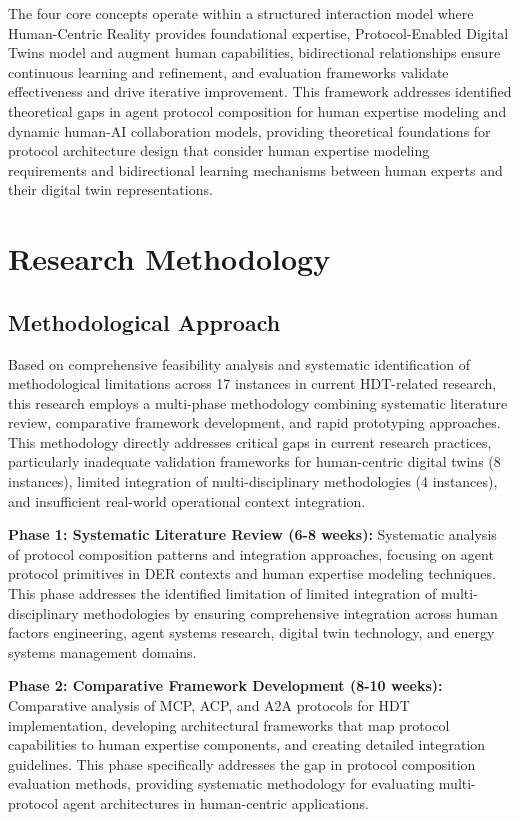 \documentclass[12pt,a4paper]{article}
\begin{document}
The four core concepts operate within a structured interaction model where Human-Centric Reality provides foundational expertise, Protocol-Enabled Digital Twins model and augment human capabilities, bidirectional relationships ensure continuous learning and refinement, and evaluation frameworks validate effectiveness and drive iterative improvement. This framework addresses identified theoretical gaps in agent protocol composition for human expertise modeling and dynamic human-AI collaboration models, providing theoretical foundations for protocol architecture design that consider human expertise modeling requirements and bidirectional learning mechanisms between human experts and their digital twin representations.

\section{Research Methodology}
\label{sec:methodology}

\subsection{Methodological Approach}

Based on comprehensive feasibility analysis and systematic identification of methodological limitations across 17 instances in current HDT-related research, this research employs a multi-phase methodology combining systematic literature review, comparative framework development, and rapid prototyping approaches. This methodology directly addresses critical gaps in current research practices, particularly inadequate validation frameworks for human-centric digital twins (8 instances), limited integration of multi-disciplinary methodologies (4 instances), and insufficient real-world operational context integration.

\textbf{Phase 1: Systematic Literature Review (6-8 weeks):} Systematic analysis of protocol composition patterns and integration approaches, focusing on agent protocol primitives in DER contexts and human expertise modeling techniques. This phase addresses the identified limitation of limited integration of multi-disciplinary methodologies by ensuring comprehensive integration across human factors engineering, agent systems research, digital twin technology, and energy systems management domains.

\textbf{Phase 2: Comparative Framework Development (8-10 weeks):} Comparative analysis of MCP, ACP, and A2A protocols for HDT implementation, developing architectural frameworks that map protocol capabilities to human expertise components, and creating detailed integration guidelines. This phase specifically addresses the gap in protocol composition evaluation methods, providing systematic methodology for evaluating multi-protocol agent architectures in human-centric applications.
\end{document}

